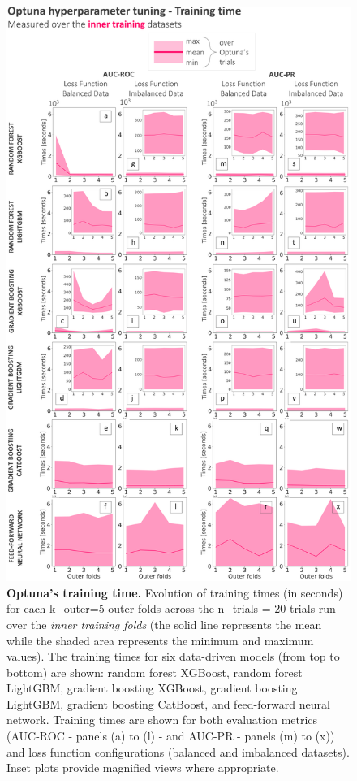 \begin{figure}[htbp]
\centering
\includegraphics[scale=0.85]{optuna_time_training.png}
\caption{\textbf{Optuna's training time.} Evolution of training times (in seconds) for each k\_outer=5 outer folds across the n\_trials = 20 trials run over the \textcolor{colourInnerTraining}{\textit{inner training folds}} (the solid line represents the mean while the shaded area represents the minimum and maximum values). The training times for six data-driven models (from top to bottom) are shown: random forest XGBoost, random forest LightGBM, gradient boosting XGBoost, gradient boosting LightGBM, gradient boosting CatBoost, and feed-forward neural network. Training times are shown for both evaluation metrics (AUC-ROC - panels (a) to (l) - and AUC-PR - panels (m) to (x)) and loss function configurations (balanced and imbalanced datasets). Inset plots provide magnified views where appropriate.}
\label{fig:optuna_time_training}
\end{figure}

